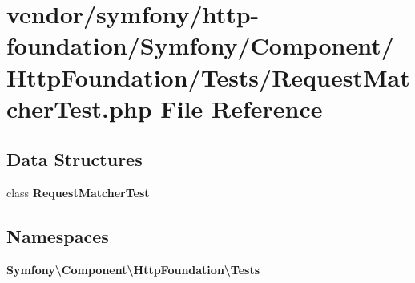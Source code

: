 \section{vendor/symfony/http-\/foundation/\+Symfony/\+Component/\+Http\+Foundation/\+Tests/\+Request\+Matcher\+Test.php File Reference}
\label{_request_matcher_test_8php}
\subsection*{Data Structures}
\begin{DoxyCompactItemize}
\item 
class {\bf Request\+Matcher\+Test}
\end{DoxyCompactItemize}
\subsection*{Namespaces}
\begin{DoxyCompactItemize}
\item 
 {\bf Symfony\textbackslash{}\+Component\textbackslash{}\+Http\+Foundation\textbackslash{}\+Tests}
\end{DoxyCompactItemize}
